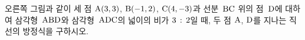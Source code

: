\noindent\begin{minipage}[t]{0.58\linewidth}\vspace{0pt}\raggedright 오른쪽 그림과 같이 세 점 $\mathrm{A}(3{,}\mkern3mu\mathopen{}3)$, $\mathrm{B}(-1{,}\mkern3mu\mathopen{}2)$, $\mathrm{C}(4{,}\mkern3mu\mathopen{}-3)$과 선분~$\mathrm{BC}$ 위의 점~$\mathrm{D}$에 대하여 삼각형~$\mathrm{ABD}$와 삼각형~$\mathrm{ADC}$의 넓이의 비가 $3\mkern3mu :\mkern3mu 2$일 때, 두 점 $\mathrm{A}$, $\mathrm{D}$를 지나는 직선의 방정식을 구하시오.\end{minipage}\hfill\begin{minipage}[t]{0.4\linewidth}\vspace{0pt}\centering \resizebox{\ifdim\width>\linewidth\linewidth\else\width\fi}{!}{}\end{minipage}\par
